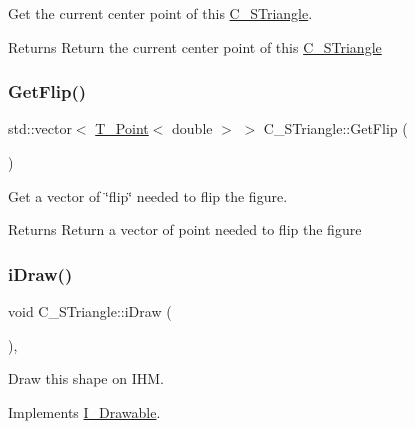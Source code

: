 Get the current center point of this \hyperlink{classC__STriangle}{C\+\_\+\+S\+Triangle}. 

\begin{DoxyReturn}{Returns}
Return the current center point of this \hyperlink{classC__STriangle}{C\+\_\+\+S\+Triangle} 
\end{DoxyReturn}
\mbox{\label{classC__STriangle_a92550826ba2d9866f2cb01b66abfbebc}} 
\subsubsection{\texorpdfstring{Get\+Flip()}{GetFlip()}}
{\footnotesize\ttfamily std\+::vector$<$ \hyperlink{classT__Point}{T\+\_\+\+Point}$<$ double $>$ $>$ C\+\_\+\+S\+Triangle\+::\+Get\+Flip (\begin{DoxyParamCaption}{ }\end{DoxyParamCaption})}



Get a vector of \char`\"{}flip\char`\"{} needed to flip the figure. 

\begin{DoxyReturn}{Returns}
Return a vector of point needed to flip the figure 
\end{DoxyReturn}
\mbox{\label{classC__STriangle_a7297480fe52b58654d81e2e70fbb237d}} 
\subsubsection{\texorpdfstring{i\+Draw()}{iDraw()}\hspace{0.1cm}{\footnotesize\ttfamily [1/2]}}
{\footnotesize\ttfamily void C\+\_\+\+S\+Triangle\+::i\+Draw (\begin{DoxyParamCaption}{ }\end{DoxyParamCaption})\hspace{0.3cm}{\ttfamily [override]}, {\ttfamily [virtual]}}



Draw this shape on I\+HM. 



Implements \hyperlink{classI__Drawable_ae24c65000977a805f52ce032321cd86f}{I\+\_\+\+Drawable}.

